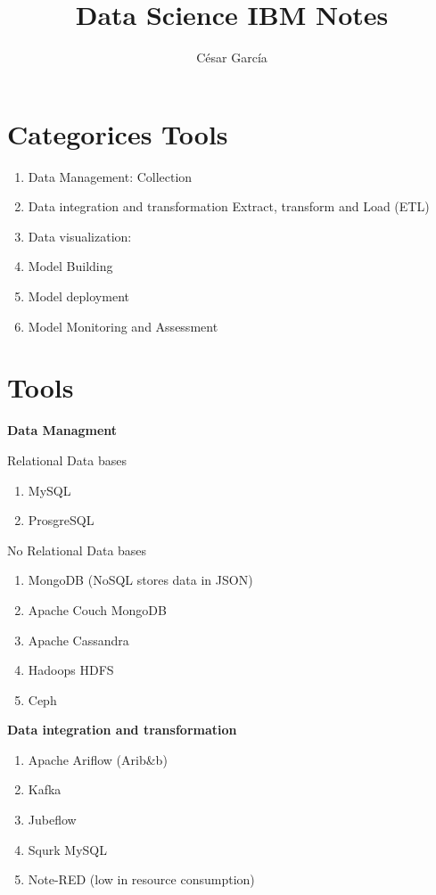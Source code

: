 \documentclass{article}
\title{Data Science IBM Notes}
\author{César García}
\begin{document}
\maketitle


\section{Categorices Tools}


\begin{enumerate}
      \item Data Management: Collection
      \item Data integration and transformation
      Extract, transform and Load (ETL)
      \item Data visualization:
      \item Model Building
      \item Model deployment
      \item Model Monitoring and Assessment
\end{enumerate}


\section{Tools}

\textbf{Data Managment}

Relational Data bases
\begin{enumerate}
      \item MySQL
      \item ProsgreSQL
\end{enumerate}
No Relational Data bases
\begin{enumerate}
      \item MongoDB (NoSQL stores data in JSON) 
      \item Apache Couch MongoDB
      \item Apache Cassandra
      \item Hadoops HDFS
      \item Ceph
\end{enumerate}

\textbf{Data integration and transformation}

\begin{enumerate}
      \item Apache Ariflow (Arib\&b)
      \item Kafka
      \item Jubeflow
      \item Squrk MySQL
      \item Note-RED (low in resource consumption)
\end{enumerate}
\end{document}
